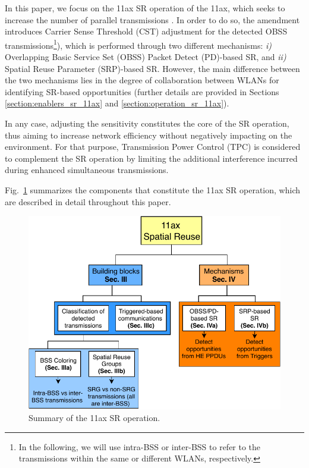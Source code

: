 \documentclass[comsoc]{IEEEtran}
\begin{document}
	In this paper, we focus on the 11ax SR operation of the 11ax, which seeks to increase the number of parallel transmissions \cite{merlin2009methods}. In order to do so, the amendment introduces Carrier Sense Threshold (CST) adjustment for the detected OBSS transmissions\footnote{In the following, we will use intra-BSS or inter-BSS to refer to the transmissions within the same or different WLANs, respectively.}), which is performed through two different mechanisms: \emph{i)} Overlapping Basic Service Set (OBSS) Packet Detect (PD)-based SR, and \emph{ii)} Spatial Reuse Parameter (SRP)-based SR. However, the main difference between the two mechanisms lies in the degree of collaboration between WLANs for identifying SR-based opportunities (further details are provided in Sections \ref{section:enablers_sr_11ax} and \ref{section:operation_sr_11ax}).
	
	In any case, adjusting the sensitivity constitutes the core of the SR operation, thus aiming to increase network efficiency without negatively impacting on the environment. For that purpose, Transmission Power Control (TPC) is considered to complement the SR operation by limiting the additional interference incurred during enhanced simultaneous transmissions. 
	
	Fig.~\ref{fig:sr_summary} summarizes the components that constitute the 11ax SR operation, which are described in detail throughout this paper.
	
	\begin{figure}[ht!]
		\centering
		\includegraphics[width=\columnwidth]{sr_summary}
		\caption{Summary of the 11ax SR operation.}
		\label{fig:sr_summary}
	\end{figure}
	
\end{document}
